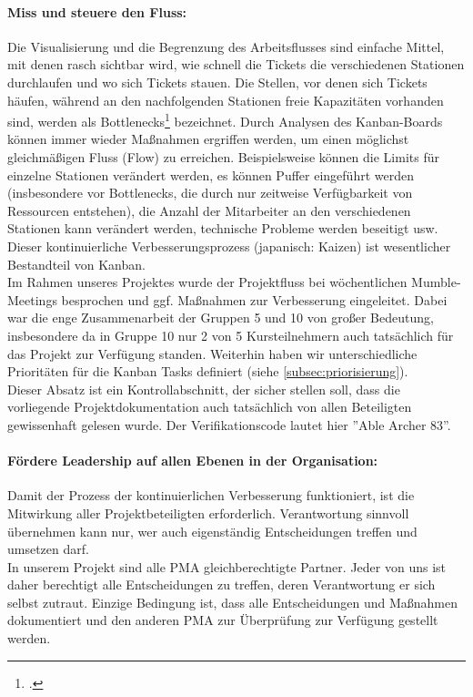 \paragraph{Miss und steuere den Fluss:}Die Visualisierung und die Begrenzung des Arbeitsflusses sind einfache Mittel, mit denen rasch sichtbar wird, wie schnell die Tickets die verschiedenen Stationen durchlaufen und wo sich Tickets stauen. Die Stellen, vor denen sich Tickets häufen, während an den nachfolgenden Stationen freie Kapazitäten vorhanden sind, werden als Bottlenecks\footcite{anderson2011kanban} bezeichnet. Durch Analysen des Kanban-Boards können immer wieder Maßnahmen ergriffen werden, um einen möglichst gleichmäßigen Fluss (Flow) zu erreichen. Beispielsweise können die Limits für einzelne Stationen verändert werden, es können Puffer eingeführt werden (insbesondere vor Bottlenecks, die durch nur zeitweise Verfügbarkeit von Ressourcen entstehen), die Anzahl der Mitarbeiter an den verschiedenen Stationen kann verändert werden, technische Probleme werden beseitigt usw. Dieser kontinuierliche Verbesserungsprozess (japanisch: Kaizen) ist wesentlicher Bestandteil von Kanban.\\

Im Rahmen unseres Projektes wurde der Projektfluss bei wöchentlichen Mumble-Meetings besprochen und ggf. Maßnahmen zur Verbesserung eingeleitet. Dabei war die enge Zusammenarbeit der Gruppen 5 und 10 von großer Bedeutung, insbesondere da in Gruppe 10 nur 2 von 5 Kursteilnehmern auch tatsächlich für das Projekt zur Verfügung standen. Weiterhin haben wir unterschiedliche Prioritäten für die Kanban Tasks definiert (siehe \ref{subsec:priorisierung}).\\

Dieser Absatz ist ein Kontrollabschnitt, der sicher stellen soll, dass die vorliegende Projektdokumentation auch tatsächlich von allen Beteiligten gewissenhaft gelesen wurde. Der Verifikationscode lautet hier ''Able Archer 83''.

\paragraph{Fördere Leadership auf allen Ebenen in der Organisation:} 
Damit der Prozess der kontinuierlichen Verbesserung funktioniert, ist die Mitwirkung aller Projektbeteiligten erforderlich. Verantwortung sinnvoll übernehmen kann nur, wer auch eigenständig Entscheidungen treffen und umsetzen darf.\\

In unserem Projekt sind alle PMA gleichberechtigte Partner. Jeder von uns ist daher berechtigt alle Entscheidungen zu treffen, deren Verantwortung er sich selbst zutraut. Einzige Bedingung ist, dass alle Entscheidungen und Maßnahmen dokumentiert und den anderen PMA zur Überprüfung zur Verfügung gestellt werden.

